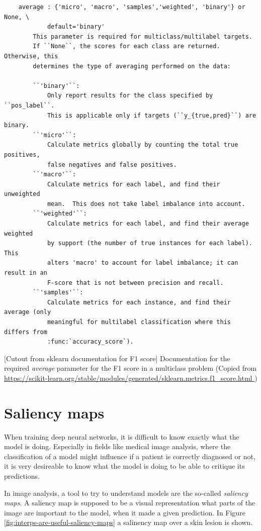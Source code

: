 \begin{center}
    \begin{verbatim}
    average : {'micro', 'macro', 'samples','weighted', 'binary'} or None, \
            default='binary'
        This parameter is required for multiclass/multilabel targets.
        If ``None``, the scores for each class are returned. Otherwise, this
        determines the type of averaging performed on the data:

        ``'binary'``:
            Only report results for the class specified by ``pos_label``.
            This is applicable only if targets (``y_{true,pred}``) are binary.
        ``'micro'``:
            Calculate metrics globally by counting the total true positives,
            false negatives and false positives.
        ``'macro'``:
            Calculate metrics for each label, and find their unweighted
            mean.  This does not take label imbalance into account.
        ``'weighted'``:
            Calculate metrics for each label, and find their average weighted
            by support (the number of true instances for each label). This
            alters 'macro' to account for label imbalance; it can result in an
            F-score that is not between precision and recall.
        ``'samples'``:
            Calculate metrics for each instance, and find their average (only
            meaningful for multilabel classification where this differs from
            :func:`accuracy_score`).
    \end{verbatim}
    [Cutout from sklearn documentation for F1 score]{
        Documentation for the required \textit{average} parameter for the F1 score in a multiclass problem
        (Copied from \url{https://scikit-learn.org/stable/modules/generated/sklearn.metrics.f1_score.html
        })}
    \label{fig:sklearn-f1-average-docs}
\end{center}

\section{Saliency maps}\label{sec:saliency_maps}
When training deep neural networks,
it is difficult to know exactly what the model is doing.
Especially in fields like medical image analysis,
where the classification of a model might influence if a patient is correctly diagnosed or not,
it is very desireable to know what the model is doing to be able to critique its predictions.

In image analysis, a tool to try to understand models are the so-called \textit{saliency maps}.
A saliency map is supposed to be a visual representation what parts of the image are important to the model,
when it made a given prediction.
In Figure \ref{fig:interps-are-useful-saliency-maps} a salinency map over a skin lesion is shown. 

